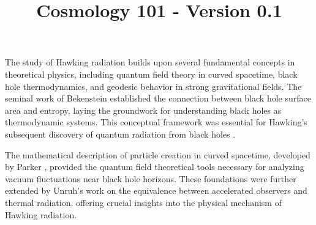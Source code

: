 \documentclass{article}\usepackage{graphicx} \usepackage{amsmath} \usepackage{colortbl}\title{Cosmology 101 - Version 0.1}
\begin{document}
The study of Hawking radiation builds upon several fundamental concepts in theoretical physics, including quantum field theory in curved spacetime, black hole thermodynamics, and geodesic behavior in strong gravitational fields. The seminal work of Bekenstein \cite{bekenstein1973black} established the connection between black hole surface area and entropy, laying the groundwork for understanding black holes as thermodynamic systems. This conceptual framework was essential for Hawking's subsequent discovery of quantum radiation from black holes \cite{hawking1974black}.

The mathematical description of particle creation in curved spacetime, developed by Parker \cite{parker1969time}, provided the quantum field theoretical tools necessary for analyzing vacuum fluctuations near black hole horizons. These foundations were further extended by Unruh's work \cite{unruh1976notes} on the equivalence between accelerated observers and thermal radiation, offering crucial insights into the physical mechanism of Hawking radiation.
\end{document}
